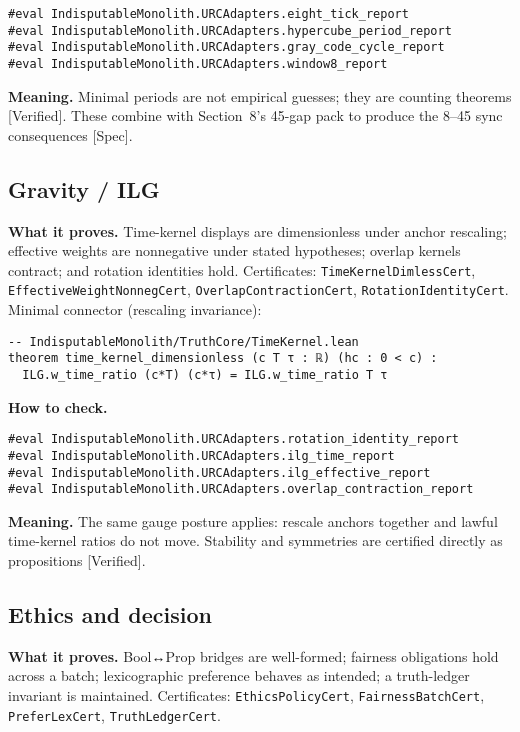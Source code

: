 \documentclass[11pt,a4paper,twoside]{article}
\numberwithin{equation}{section}
\theoremstyle{customthm}
\theoremstyle{customdef}
\theoremstyle{customrem}
\begin{document}
\begin{lstlisting}
#eval IndisputableMonolith.URCAdapters.eight_tick_report
#eval IndisputableMonolith.URCAdapters.hypercube_period_report
#eval IndisputableMonolith.URCAdapters.gray_code_cycle_report
#eval IndisputableMonolith.URCAdapters.window8_report
\end{lstlisting}

\textbf{Meaning.} Minimal periods are not empirical guesses; they are counting theorems [Verified]. These combine with Section~8's 45-gap pack to produce the 8–45 sync consequences [Spec].

\subsection{Gravity / ILG}

\textbf{What it proves.} Time-kernel displays are dimensionless under anchor rescaling; effective weights are nonnegative under stated hypotheses; overlap kernels contract; and rotation identities hold. Certificates: \texttt{TimeKernelDimlessCert}, \texttt{EffectiveWeightNonnegCert}, \texttt{OverlapContractionCert}, \texttt{RotationIdentityCert}. Minimal connector (rescaling invariance):

\begin{lstlisting}
-- IndisputableMonolith/TruthCore/TimeKernel.lean
theorem time_kernel_dimensionless (c T τ : ℝ) (hc : 0 < c) :
  ILG.w_time_ratio (c*T) (c*τ) = ILG.w_time_ratio T τ
\end{lstlisting}

\textbf{How to check.}

\begin{lstlisting}
#eval IndisputableMonolith.URCAdapters.rotation_identity_report
#eval IndisputableMonolith.URCAdapters.ilg_time_report
#eval IndisputableMonolith.URCAdapters.ilg_effective_report
#eval IndisputableMonolith.URCAdapters.overlap_contraction_report
\end{lstlisting}

\textbf{Meaning.} The same gauge posture applies: rescale anchors together and lawful time-kernel ratios do not move. Stability and symmetries are certified directly as propositions [Verified].

\subsection{Ethics and decision}

\textbf{What it proves.} Bool↔Prop bridges are well-formed; fairness obligations hold across a batch; lexicographic preference behaves as intended; a truth-ledger invariant is maintained. Certificates: \texttt{EthicsPolicyCert}, \texttt{FairnessBatchCert}, \texttt{PreferLexCert}, \texttt{TruthLedgerCert}.
\end{document}
